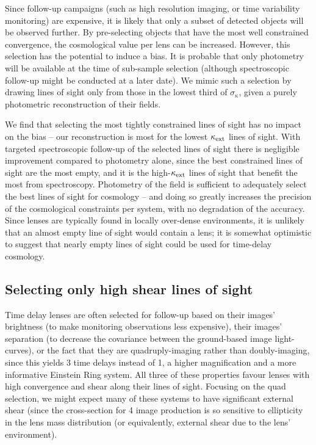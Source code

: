 \documentclass[useAMS,usenatbib]{mn2e}
\begin{document}
Since follow-up campaigns (such as high resolution imaging, or time
variability monitoring) are expensive, it is likely that only a subset of
detected objects will be observed further. By pre-selecting objects that have 
the most well constrained convergence, the cosmological value per lens can be
increased. However, this selection has the potential to induce a bias. It is
probable that only photometry will be available at the time of sub-sample
selection (although spectroscopic follow-up might be conducted at a later
date). We mimic such a selection by drawing lines of sight only from those in
the lowest third of $\sigma_{\kappa}$, given a purely photometric
reconstruction of their fields. 

We find that selecting the most tightly constrained lines of sight has no impact on the
bias -- our reconstruction is most \succesful for the lowest
$\kappa_{\rm ext}$ lines of sight. With targeted spectroscopic follow-up of the selected lines of sight
there is negligible improvement compared to photometry alone, since the best constrained lines of sight are
the most empty, and it is the high-$\kappa_{\rm ext}$ lines of sight that benefit the
most from spectroscopy. Photometry of the field is sufficient to adequately
select the best lines of sight for cosmology -- and doing so greatly increases
 the precision of the cosmological constraints per system, with no degradation of the accuracy.
Since lenses are typically found in locally over-dense environments, it is unlikely that 
an almost empty line of sight would contain a lens; it is somewhat optimistic to 
suggest that nearly empty lines of sight could be used for time-delay cosmology. 


\subsection{Selecting only high shear lines of sight}
\label{sec:bias:tightPDF}

Time delay lenses are often selected for follow-up based on their images'
brightness (to make monitoring observations less expensive), their images'
separation (to decrease the covariance between the ground-based image
light-curves), or the fact that they are quadruply-imaging rather than
doubly-imaging, since this yields 3 time delays instead of 1, a higher
magnification and a more informative Einstein Ring system. All three of these
properties favour lenses with high convergence and shear along their lines of
sight. Focusing on the quad selection, we might expect many of these systems
to have significant external shear (since the cross-section for 4 image
production is so sensitive to ellipticity in the lens mass distribution (or
equivalently, external shear due to the lens' environment). 
\end{document}
